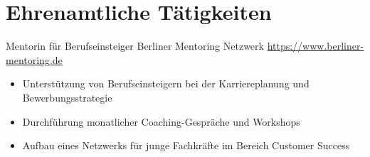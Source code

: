 \documentclass[a4paper, serif, 10pt]{moderncv}
\begin{document}
\section{Ehrenamtliche Tätigkeiten}

        {Mentorin für Berufseinsteiger}
        {Berliner Mentoring Netzwerk}
        {\url{https://www.berliner-mentoring.de}}
        {}
        {\begin{itemize}
\item Unterstützung von Berufseinsteigern bei der Karriereplanung und Bewerbungsstrategie
\item Durchführung monatlicher Coaching-Gespräche und Workshops
\item Aufbau eines Netzwerks für junge Fachkräfte im Bereich Customer Success
\end{itemize}}
    
\end{document}
